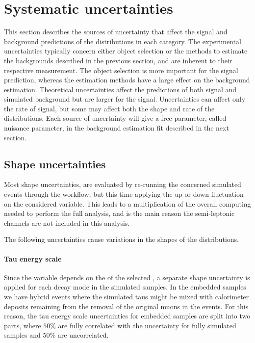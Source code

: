 \section{Systematic uncertainties}
\label{sec:analysis_systematics}

This section describes the sources of uncertainty that affect the signal and background predictions of the \mtot distributions in each category. The experimental uncertainties typically concern either object selection or the methods to estimate the backgrounds described in the previous section, and are inherent to their respective measurement. The object selection is more important for the signal prediction, whereas the estimation methods have a large effect on the background estimation. Theoretical uncertainties affect the predictions of both signal and simulated background but are larger for the signal. Uncertainties can affect only the rate of signal, but some may affect both the shape and rate of the distributions. Each source of uncertainty will give a free parameter, called nuisance parameter, in the background estimation fit described in the next section.

\subsection{Shape uncertainties}

Most shape uncertainties, are evaluated by re-running the concerned simulated events through the workflow, but this time applying the up or down fluctuation on the considered variable. This leads to a multiplication of the overall computing needed to perform the full analysis, and is the main reason the semi-leptonic channels are not included in this analysis.

The following uncertainties cause variations in the shapes of the distributions.

\paragraph{Tau energy scale} Since the \mttot variable depends on the \pt of the selected \tauh, a separate shape uncertainty is applied for each decay mode in the simulated samples. In the embedded samples we have hybrid events where the simulated taus might be mixed with calorimeter deposits remaining from the removal of the original muons in the events. For this reason, the tau energy scale uncertainties for embedded samples are split into two parts, where $50\%$ are fully correlated with the uncertainty for fully simulated samples and $50\%$ are uncorrelated.

